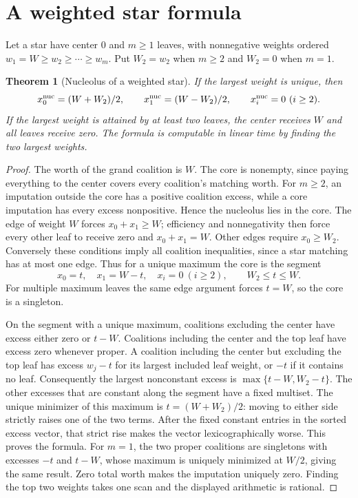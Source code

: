 \documentclass[11pt,a4paper]{article}
\newtheorem{theorem}{Theorem}[section]
\theoremstyle{definition}
\theoremstyle{remark}
\begin{document}
\section{A weighted star formula}
Let a star have center 0 and $m\geq1$ leaves, with nonnegative weights ordered $w_1=W\geq w_2\geq\cdots\geq w_m$. Put $W_2=w_2$ when $m\geq2$ and $W_2=0$ when $m=1$.

\begin{theorem}[Nucleolus of a weighted star]
If the largest weight is unique, then
\[
 x_0^{\rm nuc}=(W+W_2)/2,\qquad
 x_1^{\rm nuc}=(W-W_2)/2,\qquad x_i^{\rm nuc}=0\ (i\geq2).
\]
If the largest weight is attained by at least two leaves, the center receives $W$ and all leaves receive zero. The formula is computable in linear time by finding the two largest weights.
\end{theorem}
\begin{proof}
The worth of the grand coalition is $W$. The core is nonempty, since paying everything to the center covers every coalition's matching worth. For $m\geq2$, an imputation outside the core has a positive coalition excess, while a core imputation has every excess nonpositive. Hence the nucleolus lies in the core. The edge of weight $W$ forces $x_0+x_1\geq W$; efficiency and nonnegativity then force every other leaf to receive zero and $x_0+x_1=W$. Other edges require $x_0\geq W_2$. Conversely these conditions imply all coalition inequalities, since a star matching has at most one edge. Thus for a unique maximum the core is the segment
\[
 x_0=t,\quad x_1=W-t,\quad x_i=0\ (i\geq2),\qquad W_2\leq t\leq W.
\]
For multiple maximum leaves the same edge argument forces $t=W$, so the core is a singleton.

On the segment with a unique maximum, coalitions excluding the center have excess either zero or $t-W$. Coalitions including the center and the top leaf have excess zero whenever proper. A coalition including the center but excluding the top leaf has excess $w_j-t$ for its largest included leaf weight, or $-t$ if it contains no leaf. Consequently the largest nonconstant excess is
$\max\{t-W,W_2-t\}$. The other excesses that are constant along the segment have a fixed multiset. The unique minimizer of this maximum is $t=(W+W_2)/2$: moving to either side strictly raises one of the two terms. After the fixed constant entries in the sorted excess vector, that strict rise makes the vector lexicographically worse. This proves the formula. For $m=1$, the two proper coalitions are singletons with excesses $-t$ and $t-W$, whose maximum is uniquely minimized at $W/2$, giving the same result. Zero total worth makes the imputation uniquely zero. Finding the top two weights takes one scan and the displayed arithmetic is rational.
\end{proof}
\end{document}
